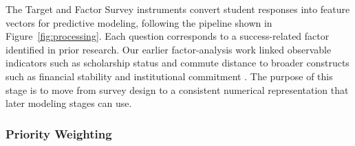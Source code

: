 \documentclass[letterpaper,11pt]{article}
\begin{document}
The Target and Factor Survey instruments convert student responses into feature vectors for predictive modeling, following the pipeline shown in Figure~\ref{fig:processing}. Each question corresponds to a success-related factor identified in prior research. Our earlier factor-analysis work linked observable indicators such as scholarship status and commute distance to broader constructs such as financial stability and institutional commitment \parencite{factoranalysis2023}. The purpose of this stage is to move from survey design to a consistent numerical representation that later modeling stages can use.

\subsubsection{Priority Weighting}
\end{document}
